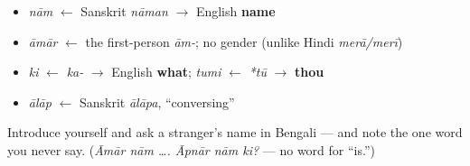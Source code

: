 \begin{grammarlens}[title={What you've built — roots you now carry}]
\begin{itemize}
\raggedright
  \item \emph{nām} $\leftarrow$ Sanskrit \emph{nāman} $\to$ English \textbf{name}
  \item \emph{āmār} $\leftarrow$ the first-person \emph{ām-}; no gender (unlike Hindi \emph{merā/merī})
  \item \emph{ki} $\leftarrow$ \emph{ka-} $\to$ English \textbf{what}; \emph{tumi} $\leftarrow$ \emph{*tū} $\to$ \textbf{thou}
  \item \emph{ālāp} $\leftarrow$ Sanskrit \emph{ālāpa}, \textquotedblleft{}conversing\textquotedblright{}
\end{itemize}
\end{grammarlens}

\begin{tcolorbox}[breakable,colback=teal!4,colframe=teal!35!black,title={Before you move on}]
Introduce yourself and ask a stranger's name in Bengali — and note the one word you never say. (\emph{Āmār nām …. Āpnār nām ki?} — no word for \textquotedblleft{}is.\textquotedblright{})
\end{tcolorbox}
